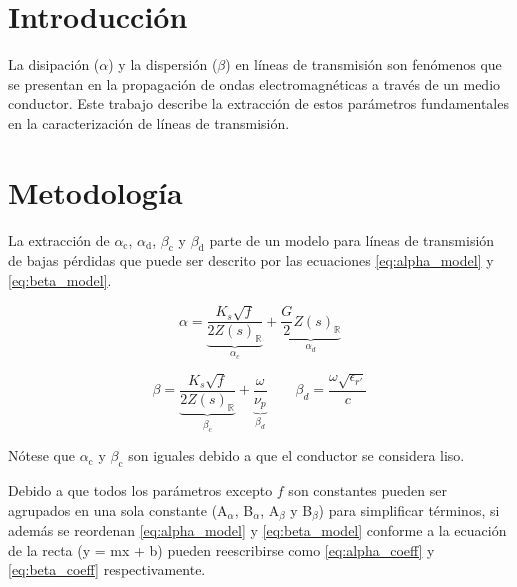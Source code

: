 \documentclass{article}   %
\newcommand*{\freq}{\mathord{\mathit{f}}}
\theoremstyle{mytheoremstyle}
\theoremstyle{mytheoremstyle}
\theoremstyle{myproblemstyle}
\begin{document}
    \noindent\begin{minipage}{0.49\textwidth}   %
        {\centering\section*{\large Introducción}}

        La disipación ($\alpha$) y la dispersión ($\beta$) en líneas de transmisión son fenómenos que se presentan
        en la propagación de ondas electromagnéticas a través de un medio conductor. Este trabajo describe la extracción de estos 
        parámetros fundamentales en la caracterización de líneas de transmisión.
        
        {\centering\section*{\large Metodología}}

        La extracción de $\alpha_{\text{c}}$, $\alpha_{\text{d}}$, $\beta_{\text{c}}$ y $\beta_{\text{d}}$ parte de un modelo para 
        líneas de transmisión de bajas pérdidas que puede ser descrito por las ecuaciones \eqref{eq:alpha_model} y \eqref{eq:beta_model}.

        \begin{equation}
            \alpha = \underbrace{\frac{K_s \sqrt{\freq}}{2 Z(s)_{\mathbb{R}}}}_{\alpha_c} + \underbrace{\frac{G}{2} Z(s)_{\mathbb{R}}}_{\alpha_d}
            \label{eq:alpha_model}
        \end{equation}

        \begin{equation}
            \beta = \underbrace{\frac{K_s \sqrt{\freq}}{2 Z(s)_{\mathbb{R}}}}_{\beta_c} + \underbrace{\frac{\omega}{\nu_p}}_{\beta_d}
            \qquad \beta_d = \frac{\omega \sqrt{\epsilon_{r'}}}{c}
            \label{eq:beta_model}
        \end{equation}

        Nótese que $\alpha_{\text{c}}$ y $\beta_{\text{c}}$ son iguales debido a que el conductor se considera liso.

        Debido a que todos los parámetros excepto $\freq$ son constantes pueden ser agrupados en una sola constante
        (A$_{\alpha}$, B$_{\alpha}$, A$_{\beta}$ y B$_{\beta}$) para simplificar términos, si además se reordenan \eqref{eq:alpha_model} 
        y \eqref{eq:beta_model} conforme a la ecuación de la recta (y = mx + b) pueden reescribirse como \eqref{eq:alpha_coeff} y 
        \eqref{eq:beta_coeff} respectivamente. 


\end{minipage}
\end{document}
